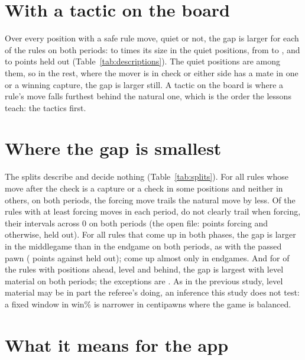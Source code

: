 \documentclass[11pt]{article}
\begin{document}
\DescriptionTable

\section{With a tactic on the board}

Over every position with a safe rule move, quiet or not, the gap is larger for each of the \NWith{}
rules on both periods: \RatioLow{} to \RatioHigh{} times its size in the quiet positions, from
\RatioLowName{} to \RatioHighName, and \AllLow{} to \AllHigh{} points held out
(Table~\ref{tab:descriptions}). The quiet positions are among them, so in the rest, where the mover is
in check or either side has a mate in one or a winning capture, the gap is larger still. A tactic on
the board is where a rule's move falls furthest behind the natural one, which is the order the
lessons teach: the tactics first.

\section{Where the gap is smallest}

The splits describe and decide nothing (Table~\ref{tab:splits}). For all \NForcing{} rules whose
move after the check is a capture or a check in some positions and neither in others, on both
periods, the forcing move trails the natural move by less. Of the \NBigForcing{} rules with at least
\ForcingMin{} forcing moves in each period, \ForcingAcrossNames{} do not clearly trail when forcing,
their intervals across 0 on both periods (the open file: \OfForcing{} points forcing and \OfQuiet{}
otherwise, held out). For all \NPhase{} rules that come up in both phases, the gap is larger in the
middlegame than in the endgame on both periods, as with the passed pawn (\PpMiddle{} points against
\PpEnd{} held out); \EndgameOnlyNames{} come up almost only in endgames. And for \NLevel{} of the
\NMaterial{} rules with positions ahead, level and behind, the gap is largest with level material
on both periods; the exceptions are \LevelNotNames. As in the previous study, level material may be
in part the referee's doing, an inference this study does not test: a fixed window in win\% is
narrower in centipawns where the game is balanced.

\SplitTable

\section{What it means for the app}
\end{document}
